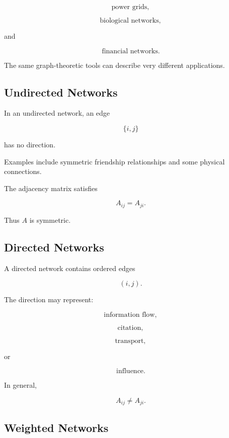 \[
\boxed{
\text{power grids},
}
\]

\[
\boxed{
\text{biological networks},
}
\]

and

\[
\boxed{
\text{financial networks}.
}
\]

The same graph-theoretic tools can describe very different applications.

\subsection{Undirected Networks}
\label{subsec:undirected-networks}

In an undirected network, an edge

\[
\{i,j\}
\]

has no direction.

Examples include symmetric friendship relationships and some physical
connections.

The adjacency matrix satisfies

\[
\boxed{
A_{ij}=A_{ji}.
}
\]

Thus \(A\) is symmetric.

\subsection{Directed Networks}
\label{subsec:directed-networks}

A directed network contains ordered edges

\[
\boxed{
(i,j).
}
\]

The direction may represent:

\[
\boxed{
\text{information flow},
}
\]

\[
\boxed{
\text{citation},
}
\]

\[
\boxed{
\text{transport},
}
\]

or

\[
\boxed{
\text{influence}.
}
\]

In general,

\[
A_{ij}
\neq
A_{ji}.
\]

\subsection{Weighted Networks}
\label{subsec:weighted-networks}

